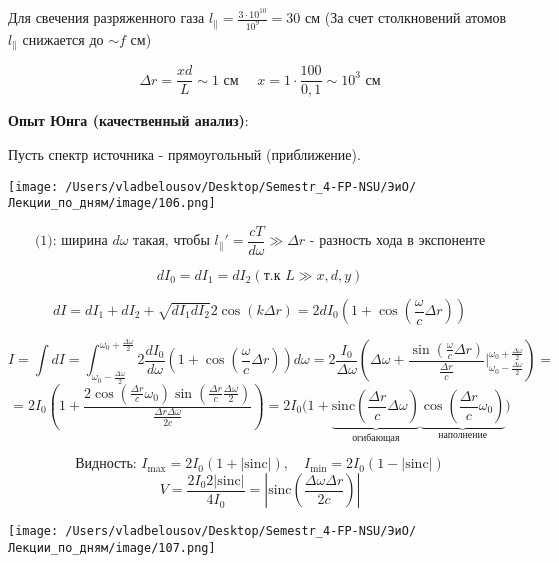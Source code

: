 \documentclass[12pt, a4paper]{report}
\begin{document}
Для свечения разряженного газа \( \displaystyle  l_{\parallel } = \frac{3 \cdot 10^{ 10 }  }{10^{9 } } = 30 \text{ см}    \) (За счет столкновений атомов \( l_{\parallel}  \) снижается до \( \sim f \text{ см}  \))

\[ \Delta r= \frac{x d }{ L } \sim 1 \text{ см }  \quad  x  = 1 \cdot \frac{ 100}{ 0,1 }  \sim 10^{3 }  \text{ см}  \] 

\textbf{Опыт Юнга (качественный анализ)}: 

Пусть спектр источника - прямоугольный (приближение). 

\begin{center}
    \texttt{[image: /Users/vladbelousov/Desktop/Semestr\_4-FP-NSU/ЭиО/Лекции\_по\_дням/image/106.png]}
\end{center}  
\[ \text{(1): ширина } d \omega \text{ такая, чтобы } l_{\parallel } ' = \frac{cT }{d \omega } \gg \Delta r \text{ - разность хода в экспоненте}     \] 

\[ d I_0 = d I_1 = d I_2 ( \text{т.к } L \gg x,d,y  ) \] 

\[ dI = d I_1 + d I_2 + \sqrt{d I_1 d I_2 } 2 \cos (k \Delta r ) = 2 d I_0 \left( 1 + \cos \left( \frac{\omega}{c }  \Delta r \right) \right) \] 

\[ I = \int d I = \int_{\omega_0- \frac{\Delta \omega }{2 } }^{\omega_0+ \frac{\Delta \omega }{2 }  } 2 \frac{d I_0 }{d \omega } \left( 1 + \cos \left( \frac{ \omega }{c } \Delta r   \right) \right) d \omega = 2 \frac{ I_0 }{\Delta \omega } \left( \Delta \omega + \frac{ \sin \left( \frac{\omega}{c }  \Delta r \right)}{\frac{\Delta r}{c} } \bigg | ^{\omega_0 + \frac{\Delta \omega }{2 }  }_{\omega_0 - \frac{\Delta \omega }{2} }   \right) = \] 
\[= 2 I_0 \left( 1+\frac{  2 \cos \left( \frac{\Delta r}{c} \omega_0  \right) \sin \left( \frac{\Delta r}{c } \frac{\Delta \omega }{2 }   \right) }{\frac{ \Delta r \Delta \omega}{ 2 c } } \right)  = 2 I_0 \bigg( 1 + \underbrace{\mathrm{sinc }  \left( \frac{\Delta r }{c } \Delta \omega   \right)}_{\text{огибающая} } \underbrace{\cos \left( \frac{\Delta r }{c } \omega_0  \right)}_{\text{наполнение} }  \bigg)\] 

\[  \text{Видность: } I_{\max  } = 2 I_0 (1 + |\mathrm{sinc }   |) , \quad  I_{ \min  } = 2 I_0 (1 - |\mathrm{sinc}  |) \]
\[ V = \frac{2 I_0 2 |\mathrm{sinc}  |}{4 I_0 } = \left\lvert \mathrm{sinc }  \left( \frac{\Delta \omega \Delta r }{2 c }  \right)  \right\rvert  \]  

\begin{center}
    \texttt{[image: /Users/vladbelousov/Desktop/Semestr\_4-FP-NSU/ЭиО/Лекции\_по\_дням/image/107.png]}
\end{center}  
\end{document}
